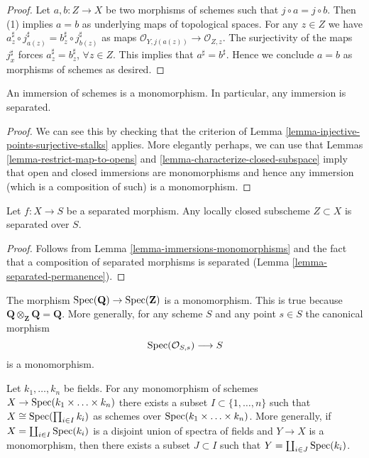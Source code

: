 \begin{proof}
Let $a, b : Z \to X$ be two morphisms of schemes such that
$j \circ a  = j \circ b$.
Then (1) implies $a = b$ as underlying
maps of topological spaces.
For any $z \in Z$ we have
$a^\sharp_z \circ j^\sharp_{a(z)} = b^\sharp_z \circ j^\sharp_{b(z)}$
as maps $\mathcal{O}_{Y, j(a(z))} \to \mathcal{O}_{Z, z}$.
The surjectivity of the maps
$j^\sharp_x$ forces $a^\sharp_z = b^\sharp_z$, $\forall z \in Z$.
This implies that $a^\sharp = b^\sharp$.
Hence we conclude $a = b$ as morphisms of schemes
as desired.
\end{proof}

\begin{lemma}
\label{lemma-immersions-monomorphisms}
An immersion of schemes is a monomorphism.
In particular, any immersion is separated.
\end{lemma}

\begin{proof}
We can see this by checking that the criterion of
Lemma \ref{lemma-injective-points-surjective-stalks} applies.
More elegantly perhaps, we can use that
Lemmas \ref{lemma-restrict-map-to-opens} and
\ref{lemma-characterize-closed-subspace} imply that
open and closed immersions are monomorphisms and hence
any immersion (which is a composition of such)
is a monomorphism.
\end{proof}

\begin{lemma}
\label{lemma-subscheme-of-separated-scheme}
Let $f : X \to S$ be a separated morphism.
Any locally closed subscheme $Z \subset X$ is separated over $S$.
\end{lemma}

\begin{proof}
Follows from Lemma \ref{lemma-immersions-monomorphisms}
and the fact that a composition of separated morphisms is separated
(Lemma \ref{lemma-separated-permanence}).
\end{proof}

\begin{example}
\label{example-Q-over-Z}
The morphism $\mathop{\rm Spec}(\mathbf{Q}) \to \mathop{\rm Spec}(\mathbf{Z})$
is a monomorphism. This is true because
$\mathbf{Q} \otimes_{\mathbf{Z}} \mathbf{Q} = \mathbf{Q}$.
More generally, for any scheme $S$ and any point $s \in S$ the
canonical morphism
$$
\mathop{\rm Spec}(\mathcal{O}_{S, s}) \longrightarrow S
$$
is a monomorphism.
\end{example}

\begin{lemma}
\label{lemma-mono-towards-spec-field}
Let $k_1, \ldots, k_n$ be fields.
For any monomorphism of schemes
$X \to \mathop{\rm Spec}(k_1 \times \ldots \times k_n)$
there exists a subset $I \subset \{1, \ldots, n\}$ such
that $X \cong \mathop{\rm Spec}(\prod_{i \in I} k_i)$ as
schemes over $\mathop{\rm Spec}(k_1 \times \ldots \times k_n)$.
More generally, if $X = \coprod_{i \in I} \mathop{\rm Spec}(k_i)$
is a disjoint union of spectra of fields and $Y \to X$ is a monomorphism,
then there exists a subset $J \subset I$ such that
$Y = \coprod_{i \in J} \mathop{\rm Spec}(k_i)$.
\end{lemma}

